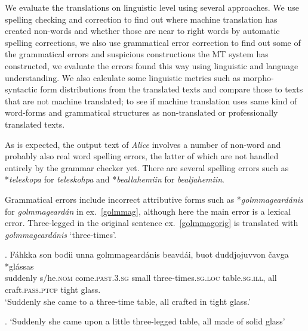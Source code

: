 \documentclass{flammie}
\begin{document}
We evaluate the translations on linguistic level using several approaches.  We
use spelling checking and correction to find out where machine translation has
created non-words and whether those are near to right words by automatic
spelling corrections, we also use grammatical error correction to find out some
of the grammatical errors and suspicious constructions the MT system has
constructed, we evaluate the errors found this way using linguistic and language
understanding.  We also calculate some linguistic metrics such as
morpho-syntactic form distributions from the translated texts and compare those
to texts that are not machine translated; to see if machine translation uses
same kind of word-forms and grammatical structures as non-translated or
professionally translated texts.






























As is expected, the output text of \textit{Alice} involves a number of non-word
and probably also real word spelling errors, the latter of which are not handled
entirely by the grammar checker yet.  There are several spelling errors such as
*\textit{teleskopa} for \textit{teleskohpa} and *\textit{beallahemiin} for
\textit{bealjahemiin}.


Grammatical errors include incorrect attributive forms such as
*\textit{golmmageardánis} for \textit{golmmageardán} in ex.~\ref{golmmag},
although here the main error is a lexical error. Three-legged in the original
sentence ex.~\ref{golmmagorig} is translated with \textit{golmmageardánis}
`three-times'.

\exg. Fáhkka son bođii unna golmmageardánis beavdái, buot duddjojuvvon čavga
*glássas\label{golmmag}\\
suddenly s/he\textsc{.nom} come\textsc{.past.3.sg} small
three-times\textsc{.sg.loc} table\textsc{.sg.ill}, all craft\textsc{.pass.ptcp}
tight glass.\\
`Suddenly she came to a three-time table, all crafted in tight glass.'

\ex. `Suddenly she came upon a little three-legged table, all made of solid
glass'\label{golmmagorig}
\end{document}

